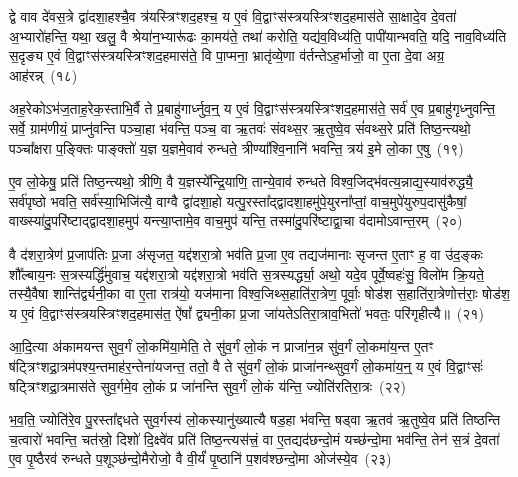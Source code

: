 द्वे वाव दे॑वस॒त्रे द्वा॑दशा॒हश्चै॒व त्र॑यस्त्रिꣳशद॒हश्च॒ य ए॒वं वि॒द्वाꣳस॑स्त्रयस्त्रिꣳशद॒हमास॑ते सा॒क्षादे॒व दे॒वता॑ अ॒भ्यारो॑हन्ति॒ यथा॒ खलु॒ वै श्रेया॑न॒भ्यारू॑ढः का॒मय॑ते॒ तथा॑ करोति॒ यद्य॑व॒विध्य॑ति॒ पापी॑यान्भवति॒ यदि॒ नाव॒विध्य॑ति स॒दृङ्य ए॒वं वि॒द्वाꣳस॑स्त्रयस्त्रिꣳशद॒हमास॑ते॒ वि पा॒प्मना॒ भ्रातृ॑व्ये॒णा व॑र्तन्ते\-ऽह॒र्भाजो॒ वा ए॒ता दे॒वा अग्र॒ आह॑रन्न्~(१८)

अह॒रेको\-ऽभ॑ज॒ताह॒रेक॒स्ताभि॒र्वै ते प्र॒बाहु॑गार्ध्नुव॒न्॒ य ए॒वं वि॒द्वाꣳस॑स्त्रयस्त्रिꣳशद॒हमास॑ते॒ सर्व॑ ए॒व प्र॒बाहु॑गृध्नुवन्ति॒ सर्वे॒ ग्राम॑णीयं॒ प्राप्नु॑वन्ति पञ्चा॒हा भ॑वन्ति॒ पञ्च॒ वा ऋ॒तवः॑ संवथ्स॒र ऋ॒तुष्वे॒व सं॑वथ्स॒रे प्रति॑ तिष्ठ॒न्त्यथो॒ पञ्चा᳚क्षरा प॒ङ्क्तिः पाङ्क्तो॑ य॒ज्ञ य॒ज्ञमे॒वाव॑ रुन्धते॒ त्रीण्या᳚श्वि॒नानि॑ भवन्ति॒ त्रय॑ इ॒मे लो॒का ए॒षु~(१९)

ए॒व लो॒केषु॒ प्रति॑ तिष्ठ॒न्त्यथो॒ त्रीणि॒ वै य॒ज्ञस्ये᳚न्द्रि॒याणि॒ तान्ये॒वाव॑ रुन्धते विश्व॒जिद्भ॑वत्य॒न्नाद्य॒स्याव॑रुद्ध्यै॒ सर्व॑पृष्ठो भवति॒ सर्व॑स्या॒भिजि॑त्यै॒ वाग्वै द्वा॑दशा॒हो यत्पु॒रस्ता᳚द्द्वादशा॒हमु॑पे॒युरना᳚प्तां॒ वाच॒मुपे॑युरुप॒दासु॑कैषां॒ वाख्स्या॑दु॒परि॑ष्टाद्द्वादशा॒हमुप॑ यन्त्या॒प्तामे॒व वाच॒मुप॑ यन्ति॒ तस्मा॑दु॒परि॑ष्टाद्वा॒चा व॑दामो\-ऽवान्त॒रम्~(२०)

वै द॑शरा॒त्रेण॑ प्र॒जा\-प॑तिः प्र॒जा अ॑सृजत॒ यद्द॑शरा॒त्रो भव॑ति प्र॒जा ए॒व तद्यज॑मानाः सृजन्त ए॒ताꣳ ह॒ वा उ॑द॒ङ्कः शौ᳚ल्बाय॒नः स॒त्रस्यर्द्धि॑मुवाच॒ यद्द॑शरा॒त्रो यद्द॑शरा॒त्रो भव॑ति स॒त्रस्यर्द्ध्या॒ अथो॒ यदे॒व पूर्वे॒ष्वहः॑सु॒ विलो॑म क्रि॒यते॒ तस्यै॒वैषा शान्ति॑र्द्व्यनी॒का वा ए॒ता रात्र॑यो॒ यज॑माना विश्व॒जिथ्स॒हाति॑रा॒त्रेण॒ पूर्वाः॒ षोड॑श स॒हाति॑रा॒त्रेणोत्त॑राः॒ षोड॑श॒ य ए॒वं वि॒द्वाꣳस॑स्त्रयस्त्रिꣳशद॒हमास॑त॒ ऐ॑षां᳚ द्व्यनी॒का प्र॒जा जा॑यते\-ऽतिरा॒त्राव॒भितो॑ भवतः॒ परि॑गृहीत्यै॥~(२१)

{\anuvakamend[{अ॒ह॒र॒न्ने॒ष्व॑वान्त॒रꣳ षोड॑श स॒ह स॒प्तद॑श च}]}%

आ॒दि॒त्या अ॑कामयन्त सुव॒र्गं लो॒कमि॑या॒मेति॒ ते सु॑व॒र्गं लो॒कं न प्राजा॑न॒न्न सु॑व॒र्गं लो॒कमा॑य॒न्त ए॒तꣳ ष॑ट्त्रिꣳशद्रा॒त्रम॑पश्य॒न्तमाह॑र॒न्तेना॑यजन्त॒ ततो॒ वै ते सु॑व॒र्गं लो॒कं प्राजा॑नन्थ्सुव॒र्गं लो॒कमा॑य॒न्॒ य ए॒वं वि॒द्वाꣳसः॑ षट्त्रिꣳशद्रा॒त्रमास॑ते सुव॒र्गमे॒व लो॒कं प्र जा॑नन्ति सुव॒र्गं लो॒कं य॑न्ति॒ ज्योति॑रतिरा॒त्रः~(२२)

भ॒व॒ति॒ ज्योति॑रे॒व पु॒रस्ता᳚द्दधते सुव॒र्गस्य॑ लो॒कस्यानु॑ख्यात्यै षड॒हा भ॑वन्ति॒ षड्वा ऋ॒तव॑ ऋ॒तुष्वे॒व प्रति॑ तिष्ठन्ति च॒त्वारो॑ भवन्ति॒ चत॑स्रो॒ दिशो॑ दि॒क्ष्वे॑व प्रति॑ तिष्ठ॒न्त्यस॑त्त्रं॒ वा ए॒तद्यद॑छन्दो॒मं यच्छ॑न्दो॒मा भव॑न्ति॒ तेन॑ स॒त्रं दे॒वता॑ ए॒व पृ॒ष्ठैरव॑ रुन्धते प॒शूञ्छ॑न्दो॒मैरोजो॒ वै वी॒र्यं॑ पृ॒ष्ठानि॑ प॒शव॑श्छन्दो॒मा ओज॑स्ये॒व~(२३)

